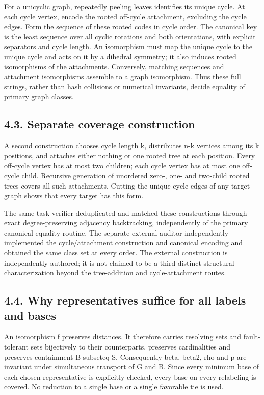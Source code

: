 \documentclass[
]{article}
\begin{document}
For a unicyclic graph, repeatedly peeling leaves identifies its unique
cycle. At each cycle vertex, encode the rooted off-cycle attachment,
excluding the cycle edges. Form the sequence of these rooted codes in
cycle order. The canonical key is the least sequence over all cyclic
rotations and both orientations, with explicit separators and cycle
length. An isomorphism must map the unique cycle to the unique cycle and
acts on it by a dihedral symmetry; it also induces rooted isomorphisms
of the attachments. Conversely, matching sequences and attachment
isomorphisms assemble to a graph isomorphism. Thus these full strings,
rather than hash collisions or numerical invariants, decide equality of
primary graph classes.

\subsection{4.3. Separate coverage
construction}\label{separate-coverage-construction}

A second construction chooses cycle length k, distributes n-k vertices
among its k positions, and attaches either nothing or one rooted tree at
each position. Every off-cycle vertex has at most two children; each
cycle vertex has at most one off-cycle child. Recursive generation of
unordered zero-, one- and two-child rooted trees covers all such
attachments. Cutting the unique cycle edges of any target graph shows
that every target has this form.

The same-task verifier deduplicated and matched these constructions
through exact degree-preserving adjacency backtracking, independently of
the primary canonical equality routine. The separate external auditor
independently implemented the cycle/attachment construction and
canonical encoding and obtained the same class set at every order. The
external construction is independently authored; it is not claimed to be
a third distinct structural characterization beyond the tree-addition
and cycle-attachment routes.

\subsection{4.4. Why representatives suffice for all labels and
bases}\label{why-representatives-suffice-for-all-labels-and-bases}

An isomorphism f preserves distances. It therefore carries resolving
sets and fault-tolerant sets bijectively to their counterparts,
preserves cardinalities and preserves containment B subseteq S.
Consequently beta, beta2, rho and p are invariant under simultaneous
transport of G and B. Since every minimum base of each chosen
representative is explicitly checked, every base on every relabeling is
covered. No reduction to a single base or a single favorable tie is
used.
\end{document}
